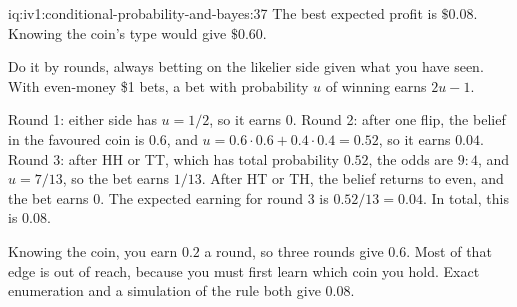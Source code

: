 \begin{solution}{iq:iv1:conditional-probability-and-bayes:37}
The best expected profit is $\$0.08$. Knowing the coin's type would give $\$0.60$.

Do it by rounds, always betting on the likelier side given what you have seen. With even-money \$1 bets, a bet with probability $u$ of winning earns $2u - 1$.

Round 1: either side has $u = 1/2$, so it earns 0. Round 2: after one flip, the belief in the favoured coin is $0.6$, and $u = 0.6 \cdot 0.6 + 0.4 \cdot 0.4 = 0.52$, so it earns $0.04$. Round 3: after HH or TT, which has total probability $0.52$, the odds are $9 : 4$, and $u = 7/13$, so the bet earns $1/13$. After HT or TH, the belief returns to even, and the bet earns 0. The expected earning for round 3 is $0.52/13 = 0.04$. In total, this is $0.08$.

Knowing the coin, you earn $0.2$ a round, so three rounds give $0.6$. Most of that edge is out of reach, because you must first learn which coin you hold. Exact enumeration and a simulation of the rule both give $0.08$.

\end{solution}

